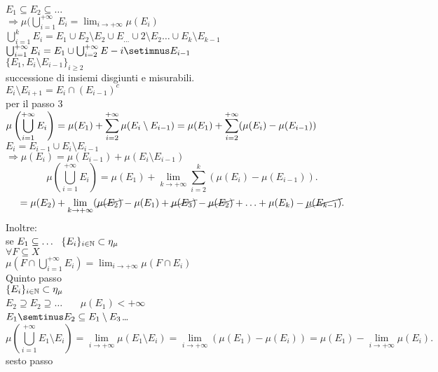 \documentclass{article}
\begin{document}
\begin{dimo}
			  $E_1\subseteq E_2\subseteq\ldots$\\
			  $ \Rightarrow \mu ( \bigcup^{+\infty}_{i=1}E_i = \lim_{i \rightarrow +\infty} \mu(E_i)$\\
			  $ \bigcup^{k}_{i=1}E_i = E_1\cup E_2\setminus E_2\cup E_\ldots\cup2\setminus E_2\ldots\cup E_k\setminus E_{k-1}$\\
			  $ \bigcup^{+\infty}_{i=1}E_i = E_1\cup \bigcup^{+\infty}_{i=2}E-i\setimnus E_{i-1}$\\
			  $\{E_1,E_i\setminus E_{i-1}\}_{i\geq 2}$\\
			  successione di insiemi disgiunti e misurabili.\\
			  $E_i\setminus E_{i+1} = E_i\cap (E_{i-1})^c$\\
			  per il passo $3$ \ \ $\displaystyle \mu \left( \bigcup^{+\infty}_{i=1}E_i \right) = \mu(E_1) + \sum^{+\infty}_{i = 2}\mu (E_i\setminus E_{i-1})\\
			  = \mu(E_1) + \sum^{+\infty}_{i=2}(\mu(E_i) - \mu (E_{i-1}))$\\
			  $E_i = E_{i-1}\cup E_i\setminus E_{i-1}$\\
			  $ \Rightarrow \mu (E_i) = \mu (E_{i-1}) + \mu (E_i\setminus E_{i-1})$
			  \[
				  \mu( \bigcup^{+\infty}_{i=1}E_i) = \mu(E_1) + \lim_{k \rightarrow + \infty} \sum^{k}_{i=2}(\mu(E_i) - \mu (E_{i-1})) 
			  .\] 
			  \[
			   = \mu(E_2) + \lim_{k \rightarrow +\infty} ( \cancel{\mu(E_2)} - \mu (E_1) + \cancel{\mu (E_3)} - \cancel{\mu (E_2)} + \ldots + \mu (E_k) - \cancel{\mu(E_{k-1})}
	   			  .\] 
			  Inoltre:\\
			  se $E_1\subseteq\ldots \ \ \{E_i\}_{i\in\N}\subset\eta_\mu$ \\
			  $\forall F\subseteq X$\\
			  $\mu \left(F\cap \bigcup^{+\infty}_{i = 1}E_i \right) = \lim_{i \rightarrow +\infty} \mu(F\cap E_i)$\\
			  Quinto passo\\
			  $\{E_i\}_{i\in\mathbb{N}}\subset \eta_\mu$\\
			   $E_2\supseteq E_2\supseteq \ldots$ \ \ \ $\mu(E_1) < +\infty$\\
			   $E_1\semtinus E_2\subseteq E_1\setminus E_3$\subseteq\ldots\\
			   \[
				   \mu \left( \bigcup^{+\infty}_{i = 1} E_1 \setminus E_{i} \right) = \lim_{i \rightarrow +\infty}\mu(E_1\setminus E_i)  = \lim_{i \rightarrow +\infty} (\mu(E_1) - \mu (E_i)) = \mu(E_1) - \lim_{i \rightarrow + \infty} \mu (E_i)
			   .\] 
			   sesto passo\\

\end{dimo}
\end{document}
